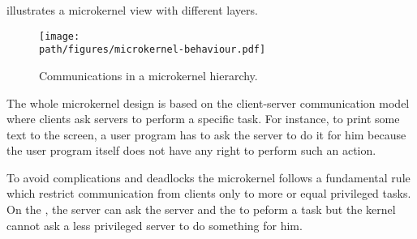  illustrates a microkernel view
with different layers.

\begin{figure}[h]
  \begin{center}
    \texttt{[image: \\path/figures/microkernel-behaviour.pdf]}
    \caption{Communications in a microkernel hierarchy.}
    \label{figure:microkernel}
  \end{center}
\end{figure}

The whole microkernel design is based on the client-server communication
model where clients ask servers to perform a specific task. For instance,
to print some text to the screen, a user program has to ask the 
server to do it for him because the user program itself does not have any
right to perform such an action.

To avoid complications and deadlocks the microkernel follows a fundamental
rule which restrict communication from clients only to more or equal
privileged tasks. On the , the
 server can ask the  server and the  to
peform a task but the kernel cannot ask a less privileged server to do
something for him.
